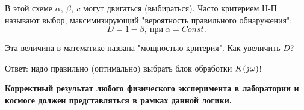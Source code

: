 \documentclass[../main/main.tex]{subfiles}
\begin{document}
\begin{enumerate}
    В этой схеме $\alpha,~\beta,~c$ могут двигаться (выбираться). Часто критерием Н-П называют выбор, максимизирующий "вероятность правильного обнаружения":
    \begin{equation}
        D = 1 - \beta,~\text{при}~ \alpha=Const.
    \end{equation}
    
    Эта величина в математике названа "мощностью критерия". Как увеличить $D$?
    
    Ответ: надо правильно (оптимально) выбрать блок обработки $K(j\omega)$!
    
    \textbf{Корректный результат любого физического эксперимента в лаборатории и космосе должен представляться в рамках данной логики.}
\end{enumerate}
\end{document}
